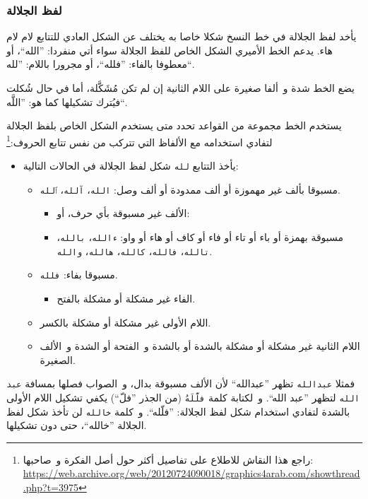 \documentclass[a4paper]{article}
\newcommand  \T[1]{\colorbox{codecolor}{\texttt{#1}}}   %
\begin{document}
\subsubsection{لفظ الجلالة}
يأخد لفظ الجلالة في خط النسخ شكلا خاصا به يختلف عن الشكل العادي للتتابع
لام لام هاء. يدعم الخط الأميري الشكل الخاص للفظ الجلالة سواء أتي منفردا:
”الله“، أو معطوفا بالفاء: ”فلله“، أو مجرورا باللام: ”لله“.

يضع الخط شدة و ألفا صغيرة على اللام الثانية إن لم تكن مُشَكَّلة، أما في
حال شُكلت فيُترك تشكيلها كما هو: ”اللَّه“.

يستخدم الخط مجموعة من القواعد تحدد متى يستخدم الشكل الخاص بلفظ الجلالة
لتفادي استخدامه مع الألفاظ التي تتركب من نفس تتابع الحروف:\footnote{راجع
هذا النقاش للاطلاع على تفاصيل أكثر حول أصل الفكرة و صاحبها:\\
\url{https://web.archive.org/web/20120724090018/graphics4arab.com/showthread.php?t=3975}}

\begin{itemize}
\item
  يأخذ التتابع \T{لله} شكل لفظ الجلالة في الحالات التالية:
  \begin{itemize}
  \item
    مسبوقا بألف غير مهموزة أو ألف ممدودة أو ألف وصل: \T{الله}،
    \T{آلله}، \T{ٱلله}.
    \begin{itemize}
    \item
      الألف غير مسبوقة بأي حرف، أو:
    \item
      مسبوقة بهمزة أو باء أو تاء أو فاء أو كاف أو هاء أو واو:
      \T{ءالله}، \T{بالله}، \T{تالله}، \T{فالله}،
      \T{كالله}، \T{هالله}، \T{والله}.
    \end{itemize}
  \item
    مسبوقا بفاء: \T{فلله}.
    \begin{itemize}
    \item
      الفاء غير مشكلة أو مشكلة بالفتح.
    \end{itemize}
  \item
    اللام الأولى غير مشكلة أو مشكلة بالكسر.
  \item
    اللام الثانية غير مشكلة أو مشكلة بالشدة أو بالشدة و الفتحة أو الشدة
    و الألف الصغيرة.
  \end{itemize}
\end{itemize}

فمثلا \T{عبدالله} تظهر ”عبدالله“ لأن الألف مسبوقة بدال، و الصواب
فصلها بمسافة \T{عبد الله} لتظهر ”عبد الله“. و لكتابة كلمة
\T{فلَّلَهُ} (من الجذر ”فلّ“) يكفي تشكيل اللام الأولى بالشدة
لتفادي استخدام شكل لفظ الجلالة: ”فلّله“. و كلمة \T{خالله} لن تأخذ
شكل لفظ الجلالة ”خالله“، حتى دون تشكيلها.
\end{document}
